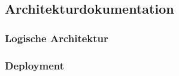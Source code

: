 \subsection{Architekturdokumentation}

\subsubsection{Logische Architektur}

\subsubsection{Deployment}
